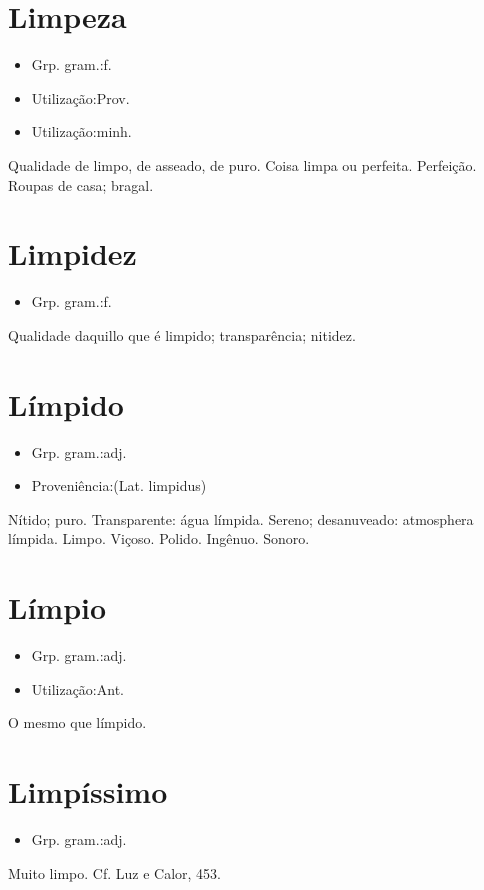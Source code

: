 \section{Limpeza}
\begin{itemize}
\item {Grp. gram.:f.}
\end{itemize}
\begin{itemize}
\item {Utilização:Prov.}
\end{itemize}
\begin{itemize}
\item {Utilização:minh.}
\end{itemize}
Qualidade de limpo, de asseado, de puro.
Coisa limpa ou perfeita.
Perfeição.
Roupas de casa; bragal.
\section{Limpidez}
\begin{itemize}
\item {Grp. gram.:f.}
\end{itemize}
Qualidade daquillo que é limpido; transparência; nitidez.
\section{Límpido}
\begin{itemize}
\item {Grp. gram.:adj.}
\end{itemize}
\begin{itemize}
\item {Proveniência:(Lat. \textunderscore limpidus\textunderscore )}
\end{itemize}
Nítido; puro.
Transparente: \textunderscore água límpida\textunderscore .
Sereno; desanuveado: \textunderscore atmosphera límpida\textunderscore .
Limpo.
Viçoso.
Polido.
Ingênuo.
Sonoro.
\section{Límpio}
\begin{itemize}
\item {Grp. gram.:adj.}
\end{itemize}
\begin{itemize}
\item {Utilização:Ant.}
\end{itemize}
O mesmo que \textunderscore límpido\textunderscore .
\section{Limpíssimo}
\begin{itemize}
\item {Grp. gram.:adj.}
\end{itemize}
Muito limpo. Cf. \textunderscore Luz e Calor\textunderscore , 453.
